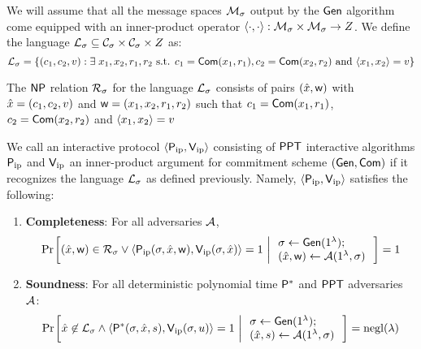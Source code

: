 We will assume that all the message spaces $\mathcal{M}_\sigma$ output by the $\mathsf{Gen}$ algorithm come equipped with an inner-product operator $\langle \cdot,\cdot\rangle:\mathcal{M}_\sigma\times \mathcal{M}_\sigma\rightarrow Z$. We define the language $\mathcal{L}_\sigma\subseteq \mathcal{C}_\sigma\times \mathcal{C}_\sigma\times Z$ as:
\begin{equation*}
\mathcal{L}_\sigma = \{(c_1,c_2,v):\exists \; x_1,x_2,r_1,r_2 \text{ s.t. }
c_1=\mathsf{Com}(x_1,r_1), c_2=\mathsf{Com}(x_2,r_2) \text{ and } \langle x_1,x_2\rangle=v\} 
\end{equation*}

The $\mathsf{NP}$ relation $\mathcal{R}_\sigma$ for the language $\mathcal{L}_\sigma$ consists of pairs $(\hat{x},\mathsf{w})$ with $\hat{x}=(c_1,c_2,v)$ and $\mathsf{w}=(x_1,x_2,r_1,r_2)$ such that $c_1=\mathsf{Com}(x_1,r_1)$, $c_2=\mathsf{Com}(x_2,r_2)$ and $\langle x_1,x_2\rangle=v$ 

\begin{definition}\label{defn:innerproductarg}
We call an interactive protocol $\langle \mathsf{P}_\mathrm{ip},\mathsf{V}_\mathrm{ip}\rangle$ consisting of $\mathsf{PPT}$ interactive algorithms $\mathsf{P}_\mathrm{ip}$ and $\mathsf{V}_\mathrm{ip}$ an inner-product argument for commitment scheme $(\mathsf{Gen},\mathsf{Com})$ if it recognizes the language $\mathcal{L}_\sigma$ as defined previously. Namely, $\langle \mathsf{P}_\mathrm{ip},\mathsf{V}_\mathrm{ip}\rangle$ satisfies the following:
\begin{enumerate}[{\rm (i)}]
\item {\bf Completeness}: For all adversaries $\mathcal{A}$,
\begin{align*}
\condprob{(\stmt,\wit)\in \calR_\sigma \vee \langle \pip(\sigma,\stmt,\wit),\vip(\sigma,\stmt)\rangle=1}{
\begin{array}{l}
\sigma\gets \gen(\secparam);\\
(\stmt,\wit)\gets \adv(\secparam,\sigma)
\end{array}
}=1
\end{align*}

\item{\bf Soundness}: For all deterministic polynomial time $\mathsf{P}^*$ and $\mathsf{PPT}$ adversaries $\mathcal{A}$:
\begin{align*}
\condprob{\stmt\not\in \calL_\sigma \wedge \langle
\prover^*(\sigma,\stmt,s),\vip(\sigma,u)\rangle=1}{
\begin{array}{l}
\sigma\gets \gen(\secparam);\\
(\stmt,s)\gets \adv(\secparam,\sigma)
\end{array}
} = \negl(\lambda)
\end{align*}
\end{enumerate}

\end{definition}

